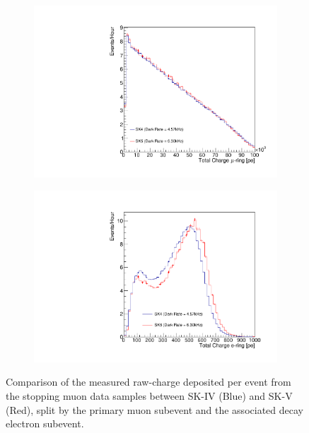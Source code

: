 \begin{figure}[h]
  \begin{subfigure}[t]{0.48\textwidth}
    \includegraphics[width=\textwidth, trim={0mm 0mm 0mm 0mm}, clip, page=1]{Figures/Selections/ChargeAssociatedWithMuon.pdf}
  \end{subfigure}%
  \begin{subfigure}[t]{0.48\textwidth}
    \includegraphics[width=\textwidth, trim={0mm 0mm 0mm 0mm}, clip, page=1]{Figures/Selections/ChargeAssociatedWithDecayE.pdf}
  \end{subfigure}  
  \caption{Comparison of the measured raw-charge deposited per event from the stopping muon data samples between SK-IV (Blue) and SK-V (Red), split by the primary muon subevent and the associated decay electron subevent.}
  \label{fig:Selection_MeasuredChargeDistribution}
\end{figure}


